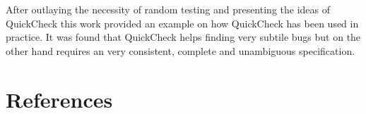 \documentclass[a4paper, 12pt]{article} %
\begin{document}
After outlaying the necessity of random testing and presenting the ideas of QuickCheck this work provided an example on how QuickCheck has been used in practice. It was found that QuickCheck helps finding very subtile bugs but on the other hand requires an very consistent, complete and unambiguous specification. 





\newpage
\section{References}
\printbibliography[heading=none]
\end{document}
